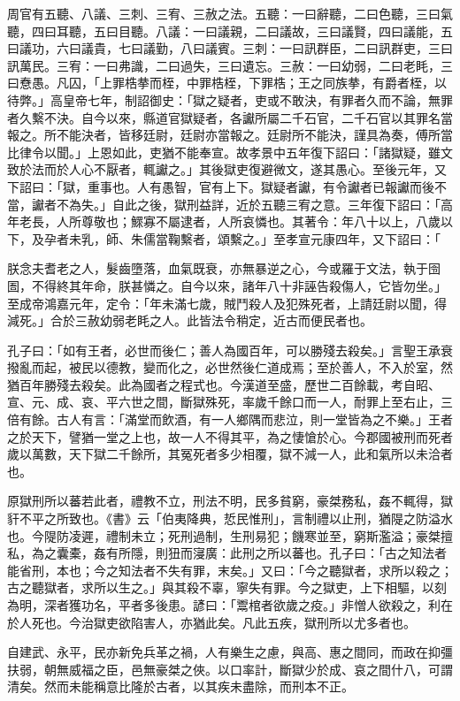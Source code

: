 \begin{pinyinscope}
周官有五聽、八議、三刺、三宥、三赦之法。五聽：一曰辭聽，二曰色聽，三曰氣聽，四曰耳聽，五曰目聽。八議：一曰議親，二曰議故，三曰議賢，四曰議能，五曰議功，六曰議貴，七曰議勤，八曰議賓。三刺：一曰訊群臣，二曰訊群吏，三曰訊萬民。三宥：一曰弗識，二曰過失，三曰遺忘。三赦：一曰幼弱，二曰老眊，三曰憃愚。凡囚，「上罪梏拲而桎，中罪梏桎，下罪梏；王之同族拲，有爵者桎，以待弊。」高皇帝七年，制詔御史：「獄之疑者，吏或不敢決，有罪者久而不論，無罪者久繫不決。自今以來，縣道官獄疑者，各讞所屬二千石官，二千石官以其罪名當報之。所不能決者，皆移廷尉，廷尉亦當報之。廷尉所不能決，謹具為奏，傅所當比律令以聞。」上恩如此，吏猶不能奉宣。故孝景中五年復下詔曰：「諸獄疑，雖文致於法而於人心不厭者，輒讞之。」其後獄吏復避微文，遂其愚心。至後元年，又下詔曰：「獄，重事也。人有愚智，官有上下。獄疑者讞，有令讞者已報讞而後不當，讞者不為失。」自此之後，獄刑益詳，近於五聽三宥之意。三年復下詔曰：「高年老長，人所尊敬也；鰥寡不屬逮者，人所哀憐也。其著令：年八十以上，八歲以下，及孕者未乳，師、朱儒當鞠繫者，頌繫之。」至孝宣元康四年，又下詔曰：「

朕念夫耆老之人，髮齒墮落，血氣既衰，亦無暴逆之心，今或羅于文法，執于囹圄，不得終其年命，朕甚憐之。自今以來，諸年八十非誣告殺傷人，它皆勿坐。」至成帝鴻嘉元年，定令：「年未滿七歲，賊鬥殺人及犯殊死者，上請廷尉以聞，得減死。」合於三赦幼弱老眊之人。此皆法令稍定，近古而便民者也。

孔子曰：「如有王者，必世而後仁；善人為國百年，可以勝殘去殺矣。」言聖王承衰撥亂而起，被民以德教，變而化之，必世然後仁道成焉；至於善人，不入於室，然猶百年勝殘去殺矣。此為國者之程式也。今漢道至盛，歷世二百餘載，考自昭、宣、元、成、哀、平六世之間，斷獄殊死，率歲千餘口而一人，耐罪上至右止，三倍有餘。古人有言：「滿堂而飲酒，有一人鄉隅而悲泣，則一堂皆為之不樂。」王者之於天下，譬猶一堂之上也，故一人不得其平，為之悽愴於心。今郡國被刑而死者歲以萬數，天下獄二千餘所，其冤死者多少相覆，獄不減一人，此和氣所以未洽者也。

原獄刑所以蕃若此者，禮教不立，刑法不明，民多貧窮，豪桀務私，姦不輒得，獄豻不平之所致也。《書》云「伯夷降典，悊民惟刑」，言制禮以止刑，猶隄之防溢水也。今隄防凌遲，禮制未立；死刑過制，生刑易犯；饑寒並至，窮斯濫溢；豪桀擅私，為之囊橐，姦有所隱，則狃而寖廣：此刑之所以蕃也。孔子曰：「古之知法者能省刑，本也；今之知法者不失有罪，末矣。」又曰：「今之聽獄者，求所以殺之；古之聽獄者，求所以生之。」與其殺不辜，寧失有罪。今之獄吏，上下相驅，以刻為明，深者獲功名，平者多後患。諺曰：「鬻棺者欲歲之疫。」非憎人欲殺之，利在於人死也。今治獄吏欲陷害人，亦猶此矣。凡此五疾，獄刑所以尤多者也。

自建武、永平，民亦新免兵革之禍，人有樂生之慮，與高、惠之間同，而政在抑彊扶弱，朝無威福之臣，邑無豪桀之俠。以口率計，斷獄少於成、哀之間什八，可謂清矣。然而未能稱意比隆於古者，以其疾未盡除，而刑本不正。


\end{pinyinscope}

